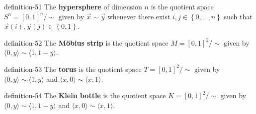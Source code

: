 \documentclass[10pt,]{article}
\newcommand{\terminology}[1]{\textbf{#1}}
\newcommand{\tuple}[1]{\langle #1 \rangle}
\newcommand{\setList}[1]{\left\{#1\right\}}
\begin{document}
\begin{definition}{}{definition-51}%
\hypertarget{p-201}{}%
The \terminology{hypersphere} of dimension \(n\) is the quotient space \(S^n=[0,1]^n/\sim\) given by \(\vec x\sim\vec y\) whenever there exist \(i,j\in\setList{0,\dots,n}\) such that \(\vec x(i),\vec y(j)\in\setList{0,1}\).%
\end{definition}
\begin{definition}{}{definition-52}%
\hypertarget{p-202}{}%
The \terminology{Möbius strip} is the quotient space \(M=[0,1]^2/\sim\) given by \(\tuple{0,y}\sim\tuple{1,1-y}\).%
\end{definition}
\begin{definition}{}{definition-53}%
\hypertarget{p-203}{}%
The \terminology{torus} is the quotient space \(T=[0,1]^2/\sim\) given by \(\tuple{0,y}\sim\tuple{1,y}\) and \(\tuple{x,0}\sim\tuple{x,1}\).%
\end{definition}
\begin{definition}{}{definition-54}%
\hypertarget{p-204}{}%
The \terminology{Klein bottle} is the quotient space \(K=[0,1]^2/\sim\) given by \(\tuple{0,y}\sim\tuple{1,1-y}\) and \(\tuple{x,0}\sim\tuple{x,1}\).%
\end{definition}
%
%
\typeout{************************************************}
\typeout{************************************************}
%
%
\appendix
%
\end{document}
